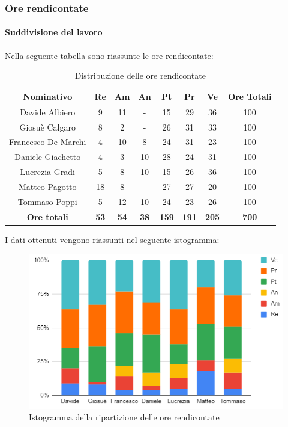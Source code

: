 \subsubsection{Ore rendicontate}
\paragraph{Suddivisione del lavoro}
Nella seguente tabella sono riassunte le ore rendicontate:
\begin{table}[H]
		\begin{center}
			\setlength{\aboverulesep}{0pt}
			\setlength{\belowrulesep}{0pt}
			\setlength{\extrarowheight}{.75ex}
			\begin{tabular}{ c c c c c c c c }
				\rowcolor{AzzurroGruppo!30} 
				\textbf{Nominativo} & \textbf{Re} & \textbf{Am} & \textbf{An} & \textbf{Pt} & \textbf{Pr} & \textbf{Ve} & \textbf{Ore Totali}  \\
				\toprule
				Davide Albiero       & 9  & 11 & -  & 15  & 29 & 36 & 100 \\
				Giosuè Calgaro      & 8  & 2 & -  & 26 & 31 & 33  & 100 \\
				Francesco De Marchi & 4  & 10 & 8  & 24 & 31 & 23  & 100\\
				Daniele Giachetto  & 4  & 3 & 10 & 28 & 24 & 31  & 100\\
				Lucrezia Gradi      & 5  & 8 & 10 & 15  & 26 & 36 & 100\\
				Matteo Pagotto      & 18 & 8 & -  & 27 & 27 & 20  & 100\\
				Tommaso Poppi       & 5  & 12 & 10 & 24  & 23 & 26  & 100\\
				 \textbf{Ore totali} & \textbf{53} & \textbf{54} & \textbf{38} & \textbf{159} & \textbf{191} & \textbf{205} & \textbf{700} \\
				\bottomrule
			\end{tabular}
			\caption{Distribuzione delle ore rendicontate}
		\end{center}
	\end{table}
	I dati ottenuti vengono riassunti nel seguente istogramma:
\begin{figure}[H]
    \centering
    \includegraphics[scale = 0.5]{components/img/rendiconto_isto.png}
    \caption{ Istogramma della ripartizione delle ore rendicontate}
    \label{fig:Istogramma ripartizione ore totali rendicontate}
\end{figure}
